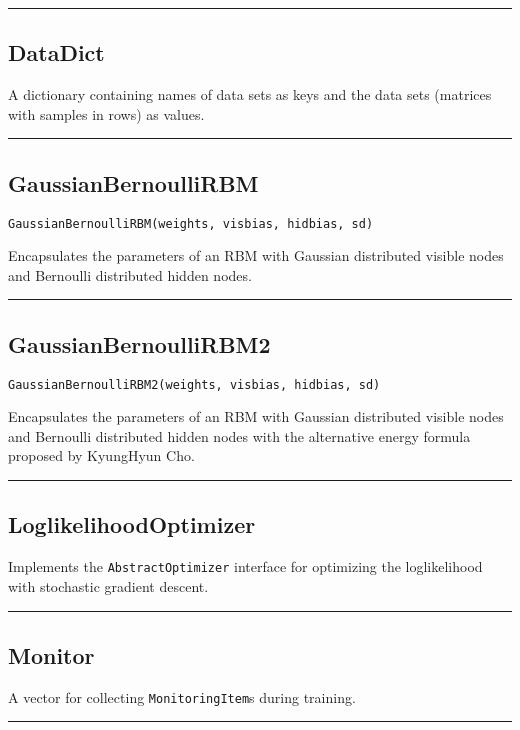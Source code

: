 \noindent\rule{\textwidth}{1pt}
\subsection*{DataDict}
A dictionary containing names of data sets as keys and the data sets (matrices with samples in rows) as values.

\noindent\rule{\textwidth}{1pt}
\subsection*{GaussianBernoulliRBM}
\begin{verbatim}
GaussianBernoulliRBM(weights, visbias, hidbias, sd)
\end{verbatim}
Encapsulates the parameters of an RBM with Gaussian distributed visible nodes and Bernoulli distributed hidden nodes.

\noindent\rule{\textwidth}{1pt}
\subsection*{GaussianBernoulliRBM2}
\begin{verbatim}
GaussianBernoulliRBM2(weights, visbias, hidbias, sd)
\end{verbatim}
Encapsulates the parameters of an RBM with Gaussian distributed visible nodes and Bernoulli distributed hidden nodes with the alternative energy formula proposed by KyungHyun Cho.

\noindent\rule{\textwidth}{1pt}
\subsection*{LoglikelihoodOptimizer}
Implements the \texttt{AbstractOptimizer} interface for optimizing the loglikelihood with stochastic gradient descent.

\noindent\rule{\textwidth}{1pt}
\subsection*{Monitor}
A vector for collecting \texttt{MonitoringItem}s during training.

\noindent\rule{\textwidth}{1pt}
